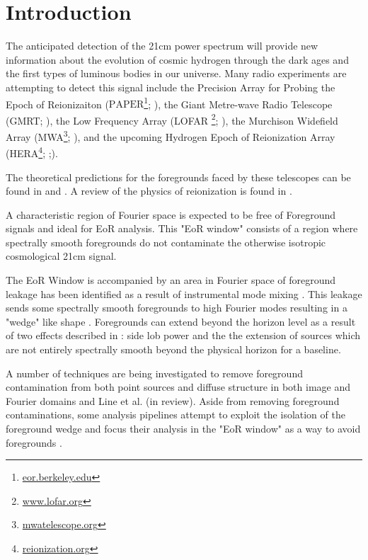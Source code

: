 \documentclass[preprint2,hidelinks]{emulateapj}
\newcommand{\PAPER}{\mathrm{PAPER}}
\begin{document}
\section{Introduction}\label{sec:intro}{
\setcounter{footnote}{0}
The anticipated detection of the 21cm power spectrum will provide 
new information about the evolution of cosmic hydrogen through the 
dark ages and the first types of luminous bodies in our universe. Many radio experiments are attempting to detect this signal include
the Precision Array for Probing the Epoch of Reionizaiton ($\PAPER$\footnote{\url{eor.berkeley.edu}}; \citealt{parsons_et_al2010}), the Giant Metre-wave Radio Telescope (GMRT; \citealt{paciga_et_al2013}), the Low Frequency Array (LOFAR \footnote{\url{www.lofar.org}}; \citealt{yatawatta_et_al2013} ), the Murchison Widefield Array (MWA\footnote{\url{mwatelescope.org}}; \citealt{bowman_et_al2012}), and the upcoming Hydrogen Epoch of Reionization Array (HERA\footnote{\url{reionization.org}}; \citealt{pober_et_al2014};). 

The theoretical predictions for the foregrounds faced by these telescopes can be found in \citet{morales_wyithe2010} and \citet{pritchard_loeb2012}. A review of the physics of reionization is found in \citet{furlanetto_et_al2006}.


A characteristic region of Fourier space is expected to be 
free of Foreground signals and ideal for EoR analysis. This "EoR 
window" consists of a region where spectrally smooth foregrounds
do not contaminate the otherwise isotropic cosmological 21cm 
signal\citep{bowman_et_al2009,morales_et_al2006a}. 

The EoR Window is accompanied by an area in Fourier space of 
foreground leakage has been identified as a result of 
instrumental mode mixing \citep{parsons_et_al2012b}.
This leakage sends some spectrally smooth foregrounds 
to high Fourier modes resulting in a "wedge" like shape
\citep{pober_et_al2013,nithya_et_al2013,nithya_et_al2015a,
nithya_et_al2015b,trott_et_al2012,liu_et_al2014a,liu_et_al2014b,
hazelton_et_al2013,morales_et_al2012,vedantham_et_al2012,
datta_et_al2010}. 
Foregrounds can extend beyond the horizon level as a result
 of two effects described in \citet{pober_et_al2012}: 
 side lob power and the the extension of sources which are not
 entirely spectrally smooth beyond the physical horizon for a 
 baseline. 
 
 A number of techniques are being investigated to 
remove foreground contamination from both point sources and 
diffuse structure in both image and Fourier domains
\citep{beardsley_et_al2016, pober_et_al2016,trott_et_al2012} and
 Line et al. (in review). 
Aside from removing foreground contaminations, some analysis pipelines attempt to exploit the isolation of the foreground wedge 
and focus their analysis in the "EoR window" 
as a way to avoid foregrounds
 \citep{jacobs_et_al2015,jacobs_et_al2016,trott_et_al2016,
 dillon_et_al2013a,dillon_et_al2015,trott_2014,
 ali_et_al2015,parsons_et_al2014}. 
 
}
\end{document}

